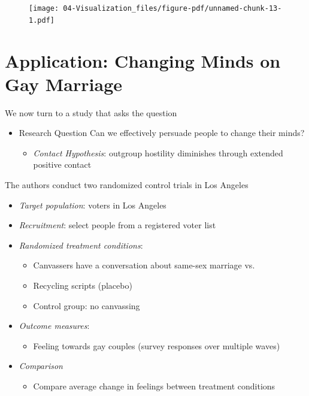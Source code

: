 \documentclass[
  letterpaper,
  DIV=11,
  numbers=noendperiod]{scrreprt}
\providecommand{\tightlist}{%
  \setlength{\itemsep}{0pt}\setlength{\parskip}{0pt}}\usepackage{longtable,booktabs,array}
\begin{document}
\begin{figure}[H]

{\centering \texttt{[image: 04-Visualization\_files/figure-pdf/unnamed-chunk-13-1.pdf]}

}

\end{figure}

\hypertarget{application-changing-minds-on-gay-marriage}{%
\section{Application: Changing Minds on Gay
Marriage}\label{application-changing-minds-on-gay-marriage}}

We now turn to a study that asks the question

\begin{itemize}
\tightlist
\item
  Research Question Can we effectively persuade people to change their
  minds?

  \begin{itemize}
  \tightlist
  \item
    \emph{Contact Hypothesis}: outgroup hostility diminishes through
    extended positive contact
  \end{itemize}
\end{itemize}

The authors conduct two randomized control trials in Los Angeles

\begin{itemize}
\tightlist
\item
  \emph{Target population}: voters in Los Angeles
\item
  \emph{Recruitment}: select people from a registered voter list
\item
  \emph{Randomized treatment conditions}:

  \begin{itemize}
  \tightlist
  \item
    Canvassers have a conversation about same-sex marriage vs.
  \item
    Recycling scripts (placebo)
  \item
    Control group: no canvassing
  \end{itemize}
\item
  \emph{Outcome measures}:

  \begin{itemize}
  \tightlist
  \item
    Feeling towards gay couples (survey responses over multiple waves)
  \end{itemize}
\item
  \emph{Comparison}

  \begin{itemize}
  \tightlist
  \item
    Compare average change in feelings between treatment conditions
  \end{itemize}
\end{itemize}
\end{document}
